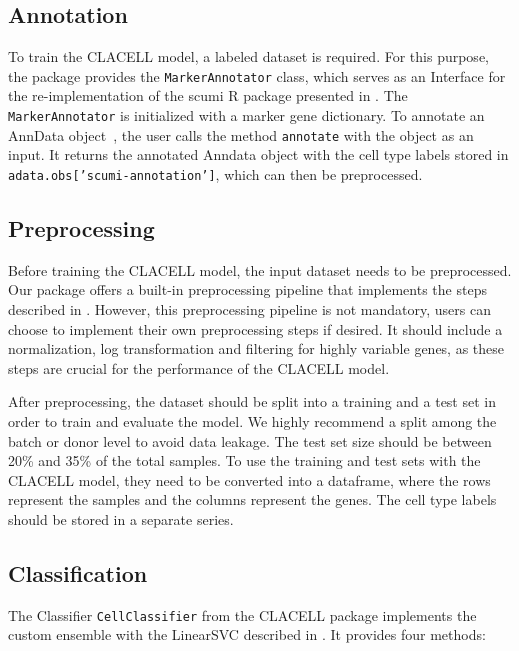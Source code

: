 \documentclass[11pt]{article}
\begin{document}
\subsection{Annotation}\label{sec:package:annotation}

To train the CLACELL model, a labeled dataset is required. For this purpose, the package provides the \texttt{MarkerAnnotator} class, which serves as an Interface for the re-implementation of the scumi R package presented in . The  \texttt{MarkerAnnotator} is initialized with a marker gene dictionary. To annotate an AnnData object~\cite{virshup_anndata_2021}, the user calls the method \texttt{annotate} with the object as an input. It returns the annotated Anndata object with the cell type labels stored in \texttt{adata.obs['scumi-annotation']}, which can then be preprocessed.


\subsection{Preprocessing}\label{sec:package:preprocessing}

Before training the CLACELL model, the input dataset needs to be preprocessed. Our package offers a built-in preprocessing pipeline that implements the steps described in . 
However, this preprocessing pipeline is not mandatory, users can choose to implement their own preprocessing steps if desired. It should include a normalization, log transformation and filtering for highly variable genes, as these steps are crucial for the performance of the CLACELL model.

After preprocessing, the dataset should be split into a training and a test set in order to train and evaluate the model. We highly recommend a split among the batch or donor level to avoid data leakage. The test set size should be between 20\% and 35\% of the total samples.
To use the training and test sets with the CLACELL model, they need to be converted into a dataframe, where the rows represent the samples and the columns represent the genes. %
The cell type labels should be stored in a separate series.


\subsection{Classification}\label{sec:package:classification}

The Classifier \texttt{CellClassifier} from the CLACELL package implements the custom ensemble with the LinearSVC described in . It provides four methods:
\end{document}
